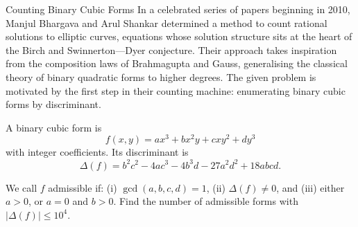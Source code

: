 \begin{problem}{Counting Binary Cubic Forms}
    In a celebrated series of papers beginning in 2010, Manjul Bhargava and Arul Shankar determined a method to count rational solutions to elliptic curves, equations whose solution structure sits at the heart of the Birch and Swinnerton—Dyer conjecture. Their approach takes inspiration from the composition laws of Brahmagupta and Gauss, generalising the classical theory of binary quadratic forms to higher degrees. The given problem is motivated by the first step in their counting machine: enumerating binary cubic forms by discriminant.

    A binary cubic form is
    \[
    f(x,y)=ax^3+bx^2y+cxy^2+dy^3
    \]
    with integer coefficients. Its discriminant is
    \[
    \Delta(f)
    =
    b^2c^2
    -4ac^3
    -4b^3d
    -27a^2d^2
    +18abcd.
    \]

    We call \(f\) admissible if: (i) \(\gcd(a,b,c,d)=1\), (ii) \(\Delta(f)\neq 0\), and (iii) either \(a>0\), or \(a=0\) and \(b>0\). Find the number of admissible forms with \(|\Delta(f)|\le 10^4\).

    
\end{problem}
